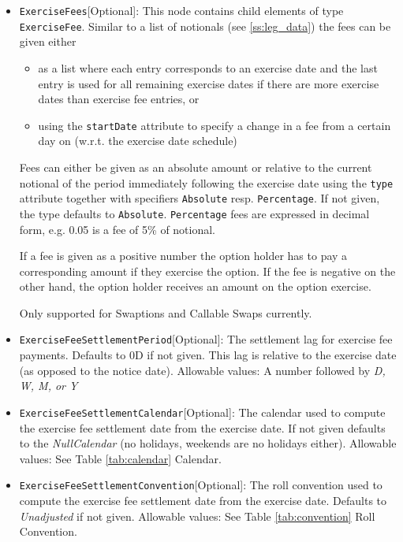 \begin{itemize}
\item \lstinline!ExerciseFees![Optional]: This node contains child elements of type \lstinline!ExerciseFee!. Similar to a list of notionals
  (see \ref{ss:leg_data}) the fees can be given either

  \begin{itemize}
  \item as a list where each entry corresponds to an exercise date and the last entry is used for all remaining exercise
    dates if there are more exercise dates than exercise fee entries, or
  \item using the \verb+startDate+ attribute to specify a change in a fee from a certain day on (w.r.t. the exercise
    date schedule)
  \end{itemize}

  Fees can either be given as an absolute amount or relative to the current notional of the period immediately following
  the exercise date using the \verb+type+ attribute together with specifiers \verb+Absolute+ resp. \verb+Percentage+. If
  not given, the type defaults to \verb+Absolute+. \verb+Percentage+ fees are expressed in decimal form, e.g. 0.05 is a fee of 5\% of notional.

  If a fee is given as a positive number the option holder has to pay a corresponding amount if they exercise the
  option. If the fee is negative on the other hand, the option holder receives an amount on the option exercise.

  Only supported for Swaptions and Callable Swaps currently.

\item \lstinline!ExerciseFeeSettlementPeriod![Optional]: The settlement lag for exercise fee payments. Defaults to 0D if not
  given. This lag is relative to the exercise date (as opposed to the notice date). Allowable values: A number followed by \emph{D, W, M, or Y}

\item \lstinline!ExerciseFeeSettlementCalendar![Optional]: The calendar used to compute the exercise fee settlement date from the
  exercise date. If not given defaults to the \emph{NullCalendar} (no holidays, weekends are no holidays either). Allowable values: See Table \ref{tab:calendar} Calendar.

\item \lstinline!ExerciseFeeSettlementConvention![Optional]: The roll convention used to compute the exercise fee settlement date from
  the exercise date. Defaults to \emph{Unadjusted} if not given. Allowable values: See Table \ref{tab:convention} Roll Convention.


\end{itemize}
